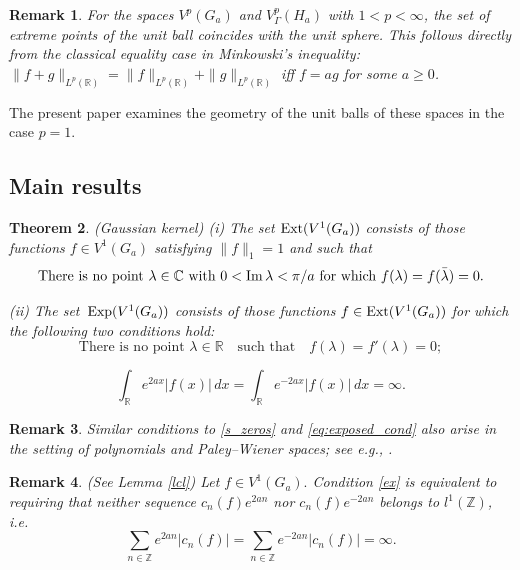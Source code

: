 \documentclass[12pt]{amsart}
\numberwithin{equation}{section}
\theoremstyle{plain}
\newtheorem{theorem}{Theorem}[section]
\newtheorem{remark}[theorem]{Remark}
\theoremstyle{definition}
\newcommand{\R}{{\mathbb R}} \newcommand{\Q}{{\mathbb Q}} \newcommand{\Z}{{\mathbb Z}} \newcommand{\N}{{\mathbb N}}
\newcommand{\ext}{{\rm Ext}}
\newcommand{\expo}{\,{\rm Exp}}
\begin{document}
\begin{remark}\label{rm} For the spaces  $V^p(G_a)$ and $V^p_\Gamma(H_a)$ with $1<p<\infty$, the set of extreme points of the unit ball coincides with the unit sphere. This follows directly from the classical equality case in Minkowski’s inequality: $\|f+g\|_{L^p(\R)}=\|f\|_{L^p(\R)}+ \|g\|_{L^p(\R)}$ iff $f=ag$ for some $a\geq0$.  \end{remark}

The present paper examines the geometry of the unit balls of these spaces in the case $p=1.$ 


\subsection{Main results}


\begin{theorem}\label{th:gauss_ext}{\rm (Gaussian kernel)}
{\rm (i)} The set $\ext(V^1(G_a))$ consists of those functions $f\in V^1(G_a)$ satisfying  $\|f\|_{1} = 1$ and such that 
\begin{equation}\label{s_zeros}
   \text{There is no  point $\lambda\in \mathbb C$ with $0<{\rm Im\,}\lambda<\pi/a$ for which } f(\lambda) = f(\bar \lambda) = 0.\end{equation}

{\rm   (ii)}      The  set $\expo(V^1(G_a))$ consists of those functions $f\in \ext(V^1(G_a))$  for which the following two conditions hold: 
    \begin{equation}\label{eq:exposed_cond}
     \text{There is no point }   \lambda \in \R \quad \text{such that} \quad f(\lambda) = f'(\lambda) = 0;
    \end{equation} 
  
\begin{equation}\label{ex}
\int_\R e^{2ax}|f(x)|\,dx =\int_\R e^{-2ax}|f(x)|\,dx =\infty.
\end{equation}
\end{theorem}

\begin{remark}
Similar conditions to \eqref{s_zeros} and \eqref{eq:exposed_cond} also arise in the setting of polynomials and Paley–Wiener spaces{\rm;} see e.g., \cite[Theorems~1 and~3]{MR1783617}.
\end{remark}

\begin{remark} {\rm (See Lemma \ref{lcl})} Let $f\in V^1(G_a).$ Condition \eqref{ex} is equivalent to requiring that neither sequence $c_{n}(f)e^{2an}$ nor $c_{n}{(f)}e^{-2an}$ belongs to $l^1(\Z)$, i.e.
        $$\sum_{n\in \Z}e^{2an}|c_n(f)|=\sum_{n \in \Z}e^{-2an}|c_n(f)|=\infty.$$
\end{remark}
 
\end{document}
